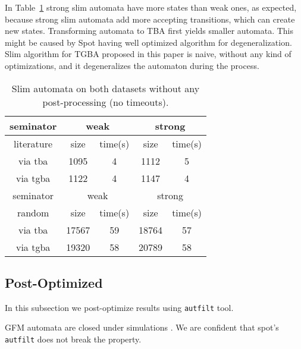 \documentclass[
	digital,
nolof, nolot
]{fithesis3}
\begin{document}
	In Table~\ref{table:seminator:unoptimized} strong slim automata have more states than weak ones, as expected, because strong slim automata add more accepting transitions, which can create new states. Transforming automata to TBA first yields smaller automata. This might be caused by Spot having well optimized algorithm for degeneralization. Slim algorithm for TGBA proposed in this paper is naive, without any kind of optimizations, and it degeneralizes the automaton during the process.
\begin{table}[ht]
	\label{table:seminator:unoptimized}
	\centering
	\caption{Slim automata on both datasets without any post-processing (no timeouts).}
		\begin{tabular}{ |c||c|c|c|c| } 
			\hline
			seminator&\multicolumn{2}{c|}{weak}&\multicolumn{2}{c|}{strong} \\
			\hline
			literature&size&time(s)&size&time(s)\\
			\hhline{|=====|}
			
			via tba	&	1095	&4	& 1112 	&5\\
			\hline
			via tgba&	1122	&4		&1147	&4\\ 
			\hline
			\hline
			\hline
			seminator&\multicolumn{2}{c|}{weak}&\multicolumn{2}{c|}{strong} \\
			\hhline{|=====|}
			random&size&time(s)&size&time(s)\\
			\hline
			via tba&17567&	59& 18764 &57\\
			\hline
			via tgba&19320&	58& 20789&58\\ 
			\hline
		\end{tabular}
\end{table}
	\clearpage
	\subsection{Post-Optimized}
	In this subsection we post-optimize results using \texttt{autfilt} tool.
	
	GFM automata are closed under simulations \cite[Section~3.1]{hlavni}. We are confident that spot's \texttt{autfilt} does not break the property.
	
\end{document}
